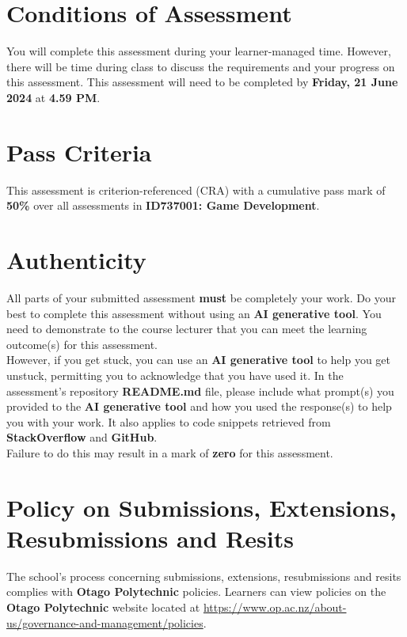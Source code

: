 \documentclass{article}
\begin{document}
\section*{Conditions of Assessment}
You will complete this assessment during your learner-managed time. However, there will be time during class to discuss the requirements and your progress on this assessment. This assessment will need to be completed by \textbf{Friday, 21 June 2024} at \textbf{4.59 PM}. 

\section*{Pass Criteria}
This assessment is criterion-referenced (CRA) with a cumulative pass mark of \textbf{50\%} over all assessments in \textbf{ID737001: Game Development}.

\section*{Authenticity}
All parts of your submitted assessment \textbf{must} be completely your work. Do your best to complete this assessment without using an \textbf{AI generative tool}. You need to demonstrate to the course lecturer that you can meet the learning outcome(s) for this assessment. \\
 
 However, if you get stuck, you can use an \textbf{AI generative tool} to help you get unstuck, permitting you to acknowledge that you have used it. In the assessment's repository \textbf{README.md} file, please include what prompt(s) you provided to the \textbf{AI generative tool} and how you used the response(s) to help you with your work. It also applies to code snippets retrieved from \textbf{StackOverflow} and \textbf{GitHub}. \\
 
 Failure to do this may result in a mark of \textbf{zero} for this assessment.

\section*{Policy on Submissions, Extensions, Resubmissions and Resits}
The school's process concerning submissions, extensions, resubmissions and resits complies with \textbf{Otago Polytechnic} policies. Learners can view policies on the \textbf{Otago Polytechnic} website located at \href{https://www.op.ac.nz/about-us/governance-and-management/policies}{https://www.op.ac.nz/about-us/governance-and-management/policies}.
\end{document}
